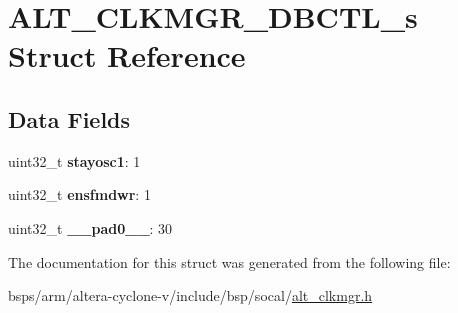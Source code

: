 \hypertarget{structALT__CLKMGR__DBCTL__s}{}\section{A\+L\+T\+\_\+\+C\+L\+K\+M\+G\+R\+\_\+\+D\+B\+C\+T\+L\+\_\+s Struct Reference}
\label{structALT__CLKMGR__DBCTL__s}
\subsection*{Data Fields}
\begin{DoxyCompactItemize}
\item 
\mbox{\label{structALT__CLKMGR__DBCTL__s_a3fc173507066a18ba8fb6ffde622dc82}} 
uint32\+\_\+t {\bfseries stayosc1}\+: 1
\item 
\mbox{\label{structALT__CLKMGR__DBCTL__s_af8879b1e2b706fb7bdd07b9090a2fb0b}} 
uint32\+\_\+t {\bfseries ensfmdwr}\+: 1
\item 
\mbox{\label{structALT__CLKMGR__DBCTL__s_adf20d1063eb9c29c0e8c2a361b793163}} 
uint32\+\_\+t {\bfseries \+\_\+\+\_\+pad0\+\_\+\+\_\+}\+: 30
\end{DoxyCompactItemize}


The documentation for this struct was generated from the following file\+:\begin{DoxyCompactItemize}
\item 
bsps/arm/altera-\/cyclone-\/v/include/bsp/socal/\mbox{\hyperlink{alt__clkmgr_8h}{alt\+\_\+clkmgr.\+h}}\end{DoxyCompactItemize}
